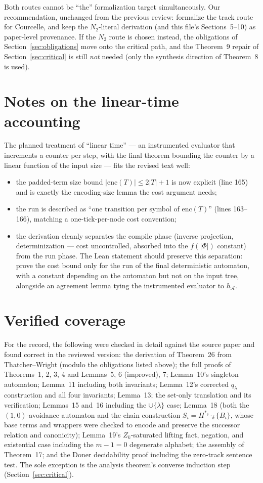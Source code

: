 \documentclass[11pt]{article}
\newcommand{\TW}{Thatcher--Wright}
\newcommand{\Aut}{\mathcal A}
\newcommand{\enc}{\mathrm{enc}}
\begin{document}
Both routes cannot be ``the'' formalization target simultaneously.  Our
recommendation, unchanged from the previous review: formalize the track route
for Courcelle, and keep the \(N_2\)-literal derivation (and this file's
Sections~5--10) as paper-level provenance.  If the \(N_2\) route is chosen
instead, the obligations of Section~\ref{sec:obligations} move onto the
critical path, and the Theorem~9 repair of Section~\ref{sec:critical} is still
\emph{not} needed (only the synthesis direction of Theorem~8 is used).

\section{Notes on the linear-time accounting}

The planned treatment of ``linear time'' --- an instrumented evaluator that
increments a counter per step, with the final theorem bounding the counter by
a linear function of the input size --- fits the revised text well:
\begin{itemize}[leftmargin=*]
  \item the padded-term size bound \(|\enc(T)|\le2|T|+1\) is now explicit
    (line 165) and is exactly the encoding-size lemma the cost argument needs;
  \item the run is described as ``one transition per symbol of
    \(\enc(T)\)'' (lines 163--166), matching a one-tick-per-node cost
    convention;
  \item the derivation cleanly separates the compile phase (inverse
    projection, determinization --- cost uncontrolled, absorbed into the
    \(f(|\Phi|)\) constant) from the run phase.  The Lean statement should
    preserve this separation: prove the cost bound only for the run of the
    final deterministic automaton, with a constant depending on the automaton
    but not on the input tree, alongside an agreement lemma tying the
    instrumented evaluator to \(h_\Aut\).
\end{itemize}

\section{Verified coverage}

For the record, the following were checked in detail against the source paper
and found correct in the reviewed version: the derivation of Theorem~26 from
\TW{} (modulo the obligations listed above); the full proofs of Theorems~1,
2, 3, 4 and Lemmas~5, 6 (improved), 7; Lemma~10's singleton automaton;
Lemma~11 including both invariants; Lemma~12's corrected \(q_\lambda\)
construction and all four invariants; Lemma~13; the set-only translation and
its verification; Lemmas~15 and~16 including the \(\cup\{\lambda\}\) case;
Lemma~18 (both the \((1,0)\)-avoidance automaton and the chain construction
\(S_i=H^{*_\delta}\cdot_\delta\{B_i\}\), whose base terms and wrappers were
checked to encode and preserve the successor relation and canonicity);
Lemma~19's \(Z_k\)-saturated lifting fact, negation, and existential case
including the \(m-1=0\) degenerate alphabet; the assembly of Theorem~17; and
the Doner decidability proof including the zero-track sentence test.  The sole
exception is the analysis theorem's converse induction step
(Section~\ref{sec:critical}).
\end{document}
